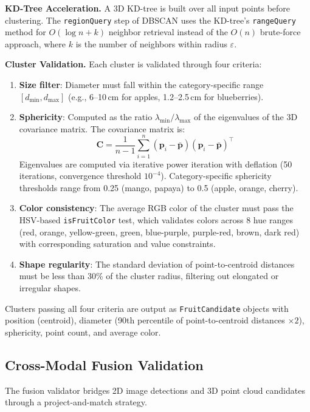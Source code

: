 \documentclass[article,final]{iclr2024_conference}
\begin{document}
\textbf{KD-Tree Acceleration.}
A 3D KD-tree is built over all input points before clustering. The \texttt{regionQuery} step of DBSCAN uses the KD-tree's \texttt{rangeQuery} method for $O(\log n + k)$ neighbor retrieval instead of the $O(n)$ brute-force approach, where $k$ is the number of neighbors within radius $\varepsilon$.

\textbf{Cluster Validation.}
Each cluster is validated through four criteria:
\begin{enumerate}[leftmargin=*,nosep]
    \item \textbf{Size filter}: Diameter must fall within the category-specific range $[d_{\min}, d_{\max}]$ (e.g., 6--10\,cm for apples, 1.2--2.5\,cm for blueberries).
    \item \textbf{Sphericity}: Computed as the ratio $\lambda_{\min}/\lambda_{\max}$ of the eigenvalues of the 3D covariance matrix. The covariance matrix is:
    \begin{equation}
    \mathbf{C} = \frac{1}{n-1}\sum_{i=1}^{n} (\mathbf{p}_i - \bar{\mathbf{p}})(\mathbf{p}_i - \bar{\mathbf{p}})^\top
    \end{equation}
    Eigenvalues are computed via iterative power iteration with deflation (50 iterations, convergence threshold $10^{-4}$). Category-specific sphericity thresholds range from 0.25 (mango, papaya) to 0.5 (apple, orange, cherry).
    \item \textbf{Color consistency}: The average RGB color of the cluster must pass the HSV-based \texttt{isFruitColor} test, which validates colors across 8 hue ranges (red, orange, yellow-green, green, blue-purple, purple-red, brown, dark red) with corresponding saturation and value constraints.
    \item \textbf{Shape regularity}: The standard deviation of point-to-centroid distances must be less than 30\% of the cluster radius, filtering out elongated or irregular shapes.
\end{enumerate}

Clusters passing all four criteria are output as \texttt{FruitCandidate} objects with position (centroid), diameter (90th percentile of point-to-centroid distances $\times 2$), sphericity, point count, and average color.

\subsection{Cross-Modal Fusion Validation}
\label{sec:fusion-validator}

The fusion validator bridges 2D image detections and 3D point cloud candidates through a project-and-match strategy.
\end{document}

